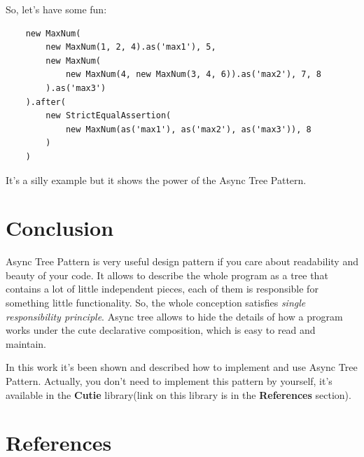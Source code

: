 \documentclass{article}
\begin{document}
So, let's have some fun:

\begin{verbatim}
    new MaxNum(
        new MaxNum(1, 2, 4).as('max1'), 5, 
        new MaxNum(
            new MaxNum(4, new MaxNum(3, 4, 6)).as('max2'), 7, 8
        ).as('max3')
    ).after(
        new StrictEqualAssertion(
            new MaxNum(as('max1'), as('max2'), as('max3')), 8 
        )
    )
\end{verbatim}

It's a silly example but it shows the power of the Async Tree Pattern.

\section{Conclusion}

Async Tree Pattern is very useful design pattern if you care about readability and beauty of your code. It allows to describe the whole program as a tree that contains a lot of little independent pieces, each of them is responsible for something little functionality. So, the whole conception satisfies \textit{single responsibility principle}. Async tree allows to hide the details of how a program works under the cute declarative composition, which is easy to read and maintain.

In this work it's been shown and described how to implement and use Async Tree Pattern. Actually, you don't need to implement this pattern by yourself, it's available in the \textbf{Cutie} library(link on this library is in the \textbf{References} section). 

\section{References}
\end{document}
